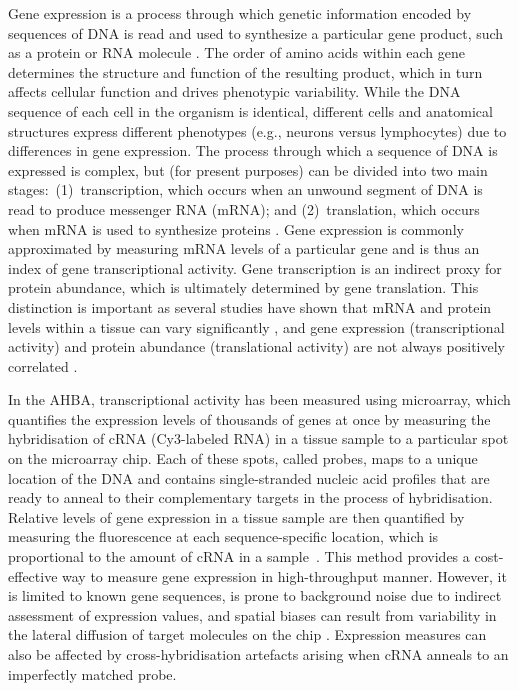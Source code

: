 Gene expression is a process through which genetic information encoded by sequences of DNA is read and used to synthesize a particular gene product, such as a protein or RNA molecule \citep{Szymanski2002}. The order of amino acids within each gene determines the structure and function of the resulting product, which in turn affects cellular function and drives phenotypic variability. While the DNA sequence of each cell in the organism is identical, different cells and anatomical structures express different phenotypes (e.g., neurons versus lymphocytes) due to differences in gene expression. The process through which a sequence of DNA is expressed is complex, but (for present purposes) can be divided into two main \mbox{stages: (1) transcription}, which occurs when an unwound segment of DNA is read to produce messenger RNA (mRNA); and \mbox{(2) translation}, which occurs when mRNA is used to synthesize proteins \citep{Krebs2014}. Gene expression is commonly approximated by measuring mRNA levels of a particular gene and is thus an index of gene transcriptional activity. Gene transcription is an indirect proxy for protein abundance, which is ultimately determined by gene translation. This distinction is important as several studies have shown that mRNA and protein levels within a tissue can vary significantly \citep{Futcher1999,Gygi1999,Greenbaum2003}, and gene expression (transcriptional activity) and protein abundance (translational activity) are not always positively correlated \citep{Margineantu2007,Schwanhausser2011}.

In the AHBA, transcriptional activity has been measured using microarray, which quantifies the expression levels of thousands of genes at once by measuring the hybridisation of cRNA (Cy3-labeled RNA) in a tissue sample to a  particular spot on the microarray chip. Each of these spots, called probes, maps to a unique location of the DNA and contains single-stranded nucleic acid profiles that are ready to anneal to their complementary targets in the process of hybridisation. Relative levels of gene expression in a tissue sample are then quantified by measuring the fluorescence at each sequence-specific location, which is proportional to the amount of cRNA in a \mbox{sample \citep{Tarca2006}}. This method provides a cost-effective way to measure gene expression in high-throughput manner. However, it is limited to known gene sequences, is prone to background noise due to indirect assessment of expression values, and spatial biases can result from variability in the lateral diffusion of target molecules on the chip \citep{Steger2011}. Expression measures can also be affected by cross-hybridisation artefacts arising when cRNA anneals to an imperfectly matched probe.

